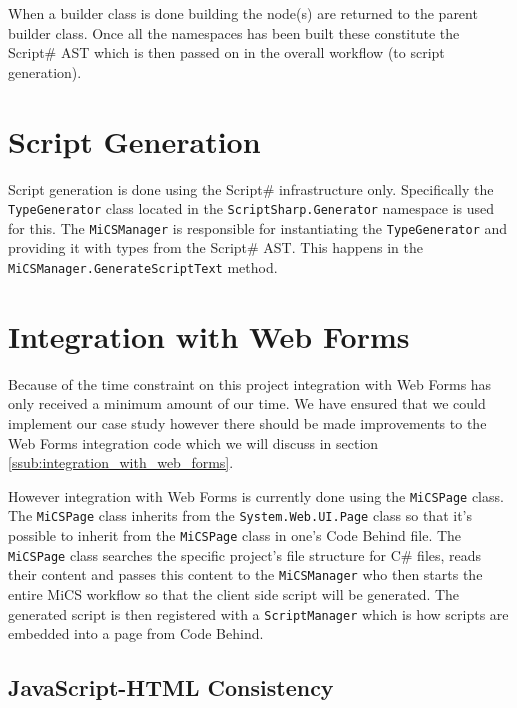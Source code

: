 	When a builder class is done building the node(s) are returned to the parent builder class. Once all the namespaces has been built these constitute the Script\# AST which is then passed on in the overall workflow (to script generation).

\section{Script Generation} %
\label{sec:script_generation}
	Script generation is done using the Script\# infrastructure only. Specifically the \texttt{TypeGenerator} class located in the \texttt{ScriptSharp.Generator} namespace is used for this. The \texttt{MiCSManager} is responsible for instantiating the \texttt{TypeGenerator} and providing it with types from the Script\# AST. This happens in the \texttt{MiCSManager.GenerateScriptText} method.

\section{Integration with Web Forms} %
\label{sec:integration_with_web_forms}
	Because of the time constraint on this project integration with Web Forms has only received a minimum amount of our time. We have ensured that we could implement our case study however there should be made improvements to the Web Forms integration code which we will discuss in section \ref{ssub:integration_with_web_forms}.

	However integration with Web Forms is currently done using the \texttt{MiCSPage} class. The \texttt{MiCSPage} class inherits from the \texttt{System.Web.UI.Page} class so that it’s possible to inherit from the \texttt{MiCSPage} class in one's Code Behind file.  The \texttt{MiCSPage} class searches the specific project's file structure for C\# files, reads their content and passes this content to the \texttt{MiCSManager} who then starts the entire MiCS workflow so that the client side script will be generated. The generated script is then registered with a \texttt{ScriptManager} which is how scripts are embedded into a page from Code Behind.

	\subsection{JavaScript-HTML Consistency} %
	\label{sub:javascript_html_consistency}
	
